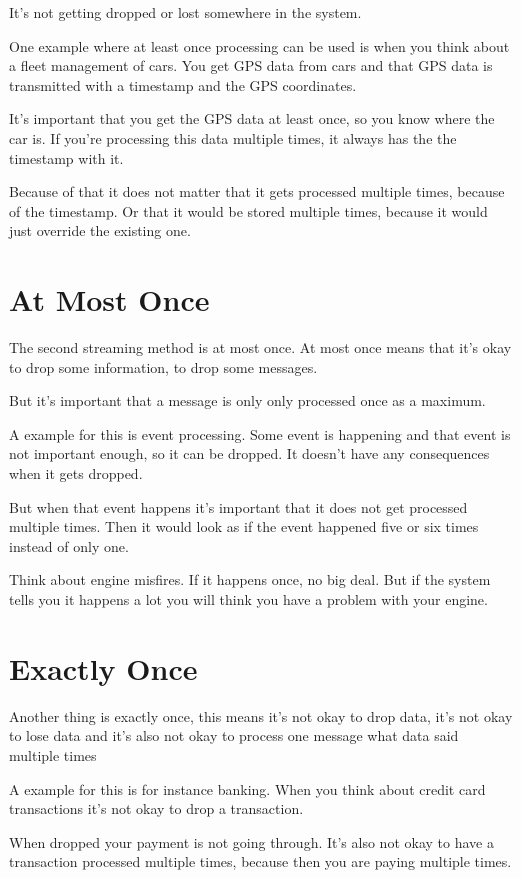 \documentclass[12pt, numbers=noenddot]{scrreprt} %
\begin{document}
It’s not getting dropped or lost somewhere in the system.

One example where at least once processing can be used is when you think about a fleet management of cars. You get GPS data from cars and that GPS data is transmitted with a timestamp and the GPS coordinates.

It’s important that you get the GPS data at least once, so you know where the car is. If you’re processing this data multiple times, it always has the the timestamp with it.

Because of that it does not matter that it gets processed multiple times, because of the timestamp. Or that it would be stored multiple times, because it would just override the existing one.

\section{At Most Once}

The second streaming method is at most once. At most once means that it’s okay to drop some information, to drop some messages.

But it’s important that a message is only only processed once as a maximum.

A example for this is event processing. Some event is happening and that event is not important enough, so it can be dropped. It doesn’t have any consequences when it gets dropped.

But when that event happens it’s important that it does not get processed multiple times. Then it would look as if the event happened five or six times instead of only one.

Think about engine misfires. If it happens once, no big deal. But if the system tells you it happens a lot you will think you have a problem with your engine.

\section{Exactly Once}

Another thing is exactly once, this means it’s not okay to drop data, it’s not okay to lose data and it’s also not okay to process one message what data said multiple times

A example for this is for instance banking. When you think about credit card transactions it’s not okay to drop a transaction.

When dropped your payment is not going through. It’s also not okay to have a transaction processed multiple times, because then you are paying multiple times.
\end{document}
